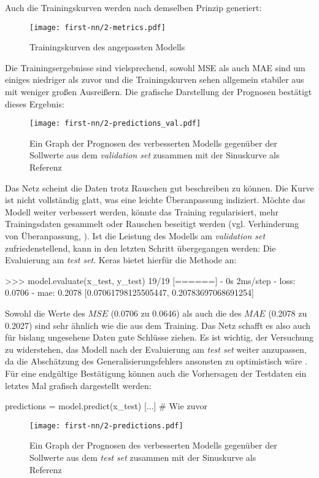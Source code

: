 Auch die Trainingskurven werden nach demselben Prinzip
generiert:
\begin{figure}[h!]
  \centering
  \texttt{[image: first-nn/2-metrics.pdf]}
  \caption{Trainingskurven des angepassten Modells}
\end{figure}

\noindent
Die Trainingsergebnisse sind vielsprechend, sowohl MSE als auch MAE
sind um einiges niedriger als zuvor und die Trainingskurven
sehen allgemein stabiler aus mit weniger großen Ausreißern.
Die grafische Darstellung der Prognosen bestätigt dieses Ergebnis:
\begin{figure}[h!]
  \centering
  \texttt{[image: first-nn/2-predictions\_val.pdf]}
  \caption{Ein Graph der Prognosen des verbesserten Modells gegenüber der Sollwerte aus dem
  \textit{validation set} zusammen mit der Sinuskurve als Referenz}
\end{figure}

\noindent
Das Netz scheint die Daten trotz Rauschen gut beschreiben zu können.
Die Kurve ist nicht vollständig glatt, was eine leichte Überanpassung
indiziert. Möchte das Modell weiter verbessert werden,
könnte das Training regularisiert,
mehr Trainingsdaten gesammelt oder Rauschen beseitigt werden
(vgl. Verhinderung von Überanpassung, \cite[28]{book:hands-on-ml}).
Ist die Leistung des Modells am \textit{validation set} zufriedenstellend,
kann in den letzten Schritt übergegangen werden: Die Evaluierung am \textit{test set}.
Keras bietet hierfür die Methode  an:
\begin{pyconcode}
>>> model.evaluate(x_test, y_test)
19/19 [======] - 0s 2ms/step - loss: 0.0706 - mae: 0.2078
[0.07061798125505447, 0.20783697068691254]
\end{pyconcode}
Sowohl die Werte des $MSE$ (\num{0.0706} zu \num{0.0646}) als auch
die des $MAE$ (\num{0.2078} zu \num{0.2027}) sind sehr ähnlich
wie die aus dem Training. Das Netz schafft es also auch für
bislang ungesehene Daten gute Schlüsse ziehen.
Es ist wichtig, der Versuchung zu widerstehen, das Modell nach
der Evaluierung am \textit{test set} weiter anzupassen, da die Abschätzung
des Generalisierungsfehlers ansonsten zu optimistisch wäre
\parencite[80]{book:hands-on-ml}.
Für eine endgültige Bestätigung können auch die Vorhersagen
der Testdaten ein letztes Mal grafisch dargestellt werden:
\begin{pythoncode}
predictions = model.predict(x_test)
[...] # Wie zuvor
\end{pythoncode}
\begin{figure}[h!]
  \centering
  \texttt{[image: first-nn/2-predictions.pdf]}
  \caption{Ein Graph der Prognosen des verbesserten Modells gegenüber der Sollwerte aus dem
  \textit{test set} zusammen mit der Sinuskurve als Referenz}
  \label{fig:predictions-train-set}
\end{figure}

